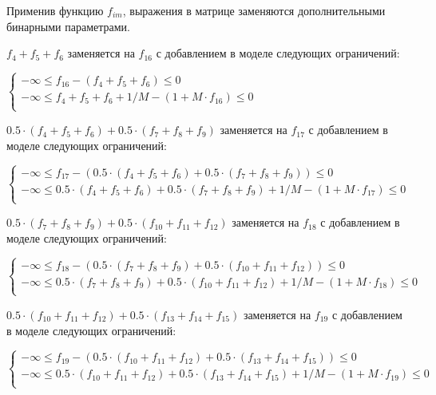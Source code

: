 \begin{enumerate}
  Применив функцию $f_{im}$, выражения в матрице заменяются дополнительными бинарными параметрами.

  $f_{4} + f_{5} + f_{6}$ заменяется на $f_{16}$ с добавлением в моделе следующих ограничений:
  \begin{center}
    $
      \begin{cases}
        -\infty \le f_{16} - (f_{4} + f_{5} + f_{6}) \le 0 \\ %
        -\infty \le f_{4} + f_{5} + f_{6} + 1 / M - (1 + M \cdot f_{16}) \le 0 \\ %
      \end{cases}
    $
  \end{center}

  $0.5 \cdot (f_{4} + f_{5} + f_{6}) + 0.5 \cdot (f_{7} + f_{8} + f_{9})$ заменяется на $f_{17}$ с добавлением в моделе следующих ограничений:
  \begin{center}
    $
      \begin{cases}
        -\infty \le f_{17} - (0.5 \cdot (f_{4} + f_{5} + f_{6}) + 0.5 \cdot (f_{7} + f_{8} + f_{9})) \le 0 \\ %
        -\infty \le 0.5 \cdot (f_{4} + f_{5} + f_{6}) + 0.5 \cdot (f_{7} + f_{8} + f_{9}) + 1 / M - (1 + M \cdot f_{17}) \le 0 \\ %
      \end{cases}
    $
  \end{center}

  $0.5 \cdot (f_{7} + f_{8} + f_{9}) + 0.5 \cdot (f_{10} + f_{11} + f_{12})$ заменяется на $f_{18}$ с добавлением в моделе следующих ограничений:
  \begin{center}
    $
      \begin{cases}
        -\infty \le f_{18} - (0.5 \cdot (f_{7} + f_{8} + f_{9}) + 0.5 \cdot (f_{10} + f_{11} + f_{12})) \le 0 \\ %
        -\infty \le 0.5 \cdot (f_{7} + f_{8} + f_{9}) + 0.5 \cdot (f_{10} + f_{11} + f_{12}) + 1 / M - (1 + M \cdot f_{18}) \le 0 \\ %
      \end{cases}
    $
  \end{center}

  $0.5 \cdot (f_{10} + f_{11} + f_{12}) + 0.5 \cdot (f_{13} + f_{14} + f_{15})$ заменяется на $f_{19}$ с добавлением в моделе следующих ограничений:
  \begin{center}
    $
      \begin{cases}
        -\infty \le f_{19} - (0.5 \cdot (f_{10} + f_{11} + f_{12}) + 0.5 \cdot (f_{13} + f_{14} + f_{15})) \le 0 \\ %
        -\infty \le 0.5 \cdot (f_{10} + f_{11} + f_{12}) + 0.5 \cdot (f_{13} + f_{14} + f_{15}) + 1 / M - (1 + M \cdot f_{19}) \le 0 \\ %
      \end{cases}
    $
  \end{center}


\end{enumerate}
